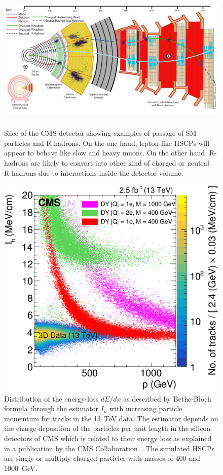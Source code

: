 \endgroup

	\begin{figure}[H]
		\centering
		\includegraphics[height=7cm]{fig/chapt4/CMS-slice-HSCPs.png}
		\caption{\label{fig:HSCPs} Slice of the CMS detector showing examples of passage of SM particles and R-hadrons. On the one hand, lepton-like HSCPs will appear to behave like slow and heavy muons. On the other hand, R-hadrons are likely to convert into other kind of charged or neutral R-hadrons due to interactions inside the detector volume.}
	\end{figure}
	
\begingroup\setlength{\intextsep}{5pt}\setlength{\columnsep}{15pt}
	
	\begin{figure}
		\centering
		\includegraphics[width=\linewidth]{fig/chapt4/HSCPs_dEdx_CMS.png}
		\caption{\label{fig:dEdx-HSCPs} Distribution of the energy-loss $dE/dx$ as described by Bethe-Bloch formula through the estimator $I_h$ with increasing particle momentum for tracks in the \SI{13}{TeV} data. The estimator depends on the charge deposition of the particles per unit length in the silicon detectors of CMS which is related to their energy loss as explained in a publication by the CMS Collaboration~\cite{CMSHSCP2016}. The simulated HSCPs are singly or multiply charged particles with masses of 400 and \SI{1000}{GeV}.}
	\end{figure}
	
